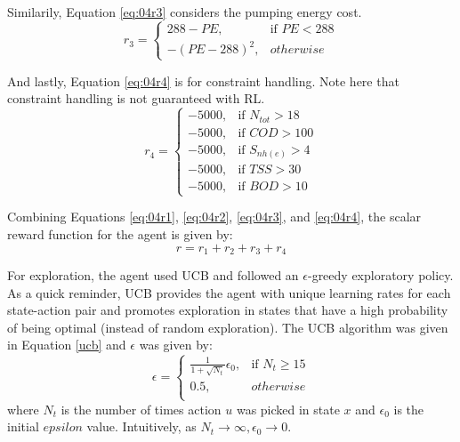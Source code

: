 Similarily, Equation \ref{eq:04r3} considers the pumping energy cost.
\begin{equation}
    r_3 =
\begin{cases}
    288 - PE,              & \text{if } PE  < 288 \\
    -(PE - 288)^2,              & otherwise 
    \label{eq:04r3}
\end{cases}
\end{equation}

And lastly, Equation \ref{eq:04r4} is for constraint handling.  Note here that constraint handling is not guaranteed with RL.
\begin{equation}
    r_4 =
\begin{cases}
    -5000,              & \text{if } N_{tot} > 18 \\
    -5000,              & \text{if } COD > 100 \\
    -5000,              & \text{if } S_{nh(e)} > 4 \\
    -5000,              & \text{if } TSS > 30 \\
    -5000,              & \text{if } BOD > 10 
    \label{eq:04r4}
\end{cases}
\end{equation}

Combining Equations \ref{eq:04r1}, \ref{eq:04r2}, \ref{eq:04r3}, and \ref{eq:04r4}, the scalar reward function for the agent is given by:
\begin{equation}
    r = r_1 + r_2 + r_3 + r_4
    \label{eq:04WWTP_reward}
\end{equation}

For exploration, the agent used UCB and followed an $\epsilon$-greedy exploratory policy. As a quick reminder, UCB provides the agent with unique learning rates for each state-action pair and promotes exploration in states that have a high probability of being optimal (instead of random exploration). The UCB algorithm was given in Equation \ref{ucb} and $\epsilon$ was given by:
\[
    \epsilon =
\begin{cases}
    \frac{1}{1 + \sqrt{N_t}}\epsilon_0,              & \text{if } N_t  \geq 15 \\
    0.5,              & otherwise \\
\end{cases}
\]
where $N_t$ is the number of times action $u$ was picked in state $x$ and $\epsilon_0$ is the initial $epsilon$ value.  Intuitively, as $N_t \rightarrow \infty, \epsilon_0 \rightarrow 0$.

